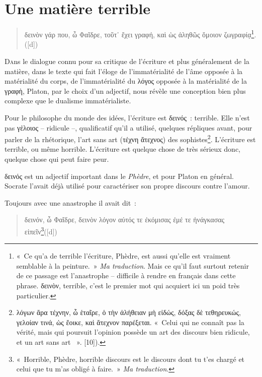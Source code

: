 \hypertarget{une-matiuxe8re-terrible}{%
\chapter{Une matière terrible}\label{une-matiuxe8re-terrible}}

\begin{quote}
δεινὸν γάρ που, ὦ Φαῖδρε, τοῦτ᾽ ἔχει γραφή, καὶ ὡς ἀληθῶς ὅμοιον
ζωγραφίᾳ\footnote{«~Ce qu'a de terrible l'écriture, Phèdre, est aussi
  qu'elle est vraiment semblable à la peinture.~» \emph{Ma traduction}.
  Mais ce qu'il faut surtout retenir de ce passage est l'anastrophe --
  difficile à rendre en français dans cette phrase. δεινὸν, terrible,
  c'est le premier mot qui acquiert ici un poid très particulier.}.
([d])
\end{quote}

\lettrine{D}ans le dialogue connu pour sa critique de l'écriture et plus
généralement de la matière, dans le texte qui fait l'éloge de
l'immatérialité de l'âme opposée à la matérialité du corps, de
l'immatérialité du λόγος opposée à la matérialité de la γραφὴ, Platon,
par le choix d'un adjectif, nous révèle une conception bien plus
complexe que le dualisme immatérialiste.

Pour le philosophe du monde des idées, l'écriture est δεινός~: terrible.
Elle n'est pas γἑλοιος -- ridicule --, qualificatif qu'il a utilisé,
quelques répliques avant, pour parler de la rhétorique, l'art sans art
(τέχνη ἄτεχνος) des sophistes\footnote{λόγων ἄρα τέχνην, ὦ ἑταῖρε, ὁ τὴν
  ἀλήθειαν μὴ εἰδώς, δόξας δὲ τεθηρευκώς, γελοίαν τινά, ὡς ἔοικε, καὶ
  ἄτεχνον παρέξεται. «~Celui qui ne connaît pas la vérité, mais qui
  poursuit l'opinion possède un art des discours bien ridicule, et un
  art sans art ~». [10]).}. L'écriture est terrible,
ou même horrible. L'écriture est quelque chose de très sérieux donc,
quelque chose qui peut faire peur.

δεινός est un adjectif important dans le \emph{Phèdre}, et pour Platon
en général. Socrate l'avait déjà utilisé pour caractériser son propre
discours contre l'amour.

Toujours avec une anastrophe il avait dit~:

\begin{quote}
δεινόν, ὦ Φαῖδρε, δεινὸν λόγον αὐτός τε ἐκόμισας ἐμέ τε ἠνάγκασας
εἰπεῖν\footnote{«~Horrible, Phèdre, horrible discours est le discours
  dont tu t'es chargé et celui que tu m'as obligé à faire.~» \emph{Ma
  traduction}.}([d])
\end{quote}

